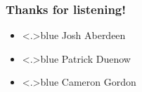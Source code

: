 \documentclass[handout,english]{beamer}
\begin{document}
\begin{frame}
\frametitle{Thanks for listening!}

\begin{itemize}
\item<+-|alert@+>{\color<.>{blue}
        Josh Aberdeen
        }
\item<+-|alert@+>{\color<.>{blue}
        Patrick Duenow
        }
\item<+-|alert@+>{\color<.>{blue}
        Cameron Gordon
        }

\end{itemize}

\vfill\end{frame}


\end{document}
